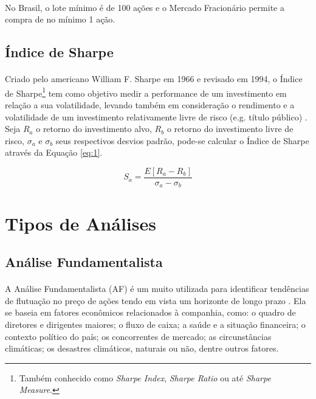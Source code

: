 \paragraph{} No Brasil, o lote mínimo é de 100 ações e o Mercado Fracionário permite a compra de no mínimo 1 ação.

\subsection{Índice de Sharpe}

\paragraph{} Criado pelo americano William F. Sharpe em 1966 e revisado em 1994, o Índice de Sharpe\footnote{Também conhecido como \textit{Sharpe Index}, \textit{Sharpe Ratio} ou até \textit{Sharpe Measure}.} tem como objetivo medir a performance de um investimento em relação a sua volatilidade, levando também em consideração o rendimento e a volatilidade de um investimento relativamente livre de risco (e.g. título público) \cite{sharpe1998sharpe}. Seja \begin{math}R_a\end{math} o retorno do investimento alvo, \begin{math}R_b\end{math} o retorno do investimento livre de risco, \begin{math}\sigma_a\end{math} e \begin{math}\sigma_b\end{math} seus respectivos desvios padrão, pode-se calcular o Índice de Sharpe através da Equação \ref{eq:1}.

\begin{equation} \label{eq:1}
    S_a = \frac{E[R_a - R_b]}{\sigma_a - \sigma_b}
\end{equation}


\section{Tipos de Análises}

\subsection{Análise Fundamentalista}
\label{subsection:af}

\paragraph{} A Análise Fundamentalista (AF) é um muito utilizada para identificar tendências de flutuação no preço de ações tendo em vista um horizonte de longo prazo \cite{bulkowski2012fundamental}. Ela se baseia em fatores econômicos relacionados à companhia, como: o quadro de diretores e dirigentes maiores; o fluxo de caixa; a saúde e a situação financeira; o contexto político do país; os concorrentes de mercado; as circunstâncias climáticas; os desastres climáticos, naturais ou não, dentre outros fatores.

